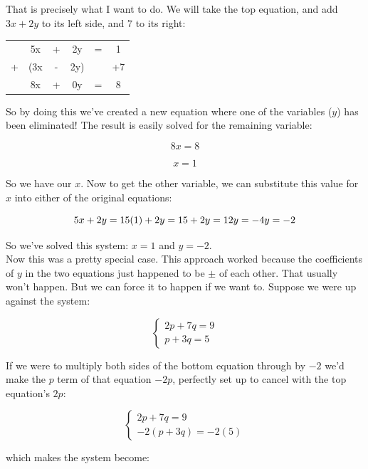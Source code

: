 That is precisely what I want to do. We will take the top equation, and add $3x+2y$ to its left side, and $7$ to its right:

\begin{center}
	\begin{tabular}{c@{\,}c@{\,}c@{\,}c@{\,}c@{\,}c}
		& 5x &+ & 2y & = & 1 \\
		+ & (3x &- & 2y) & & +7 \\
		\hline
		& 8x & + & 0y & = & 8 \\
	\end{tabular}
\end{center}

So by doing this we’ve created a new equation where one of the variables ($y$) has been eliminated!  The result is easily solved for the remaining variable:

$$8x=8$$

$$x=1$$

So we have our $x$. Now to get the other variable, we can substitute this value for $x$ into either of the original equations:

\begin{equation*}
	5x+2y=1\\
	5(1)+2y=1\\
	5+2y=1\\
	2y=-4\\
	y=-2
\end{equation*}

So we’ve solved this system: $x=1$ and $y=-2$.\\

Now this was a pretty special case. This approach worked because the coefficients of $y$ in the two equations just happened to be $\pm$ of each other. That usually won’t happen. But we can force it to happen if we want to. Suppose we were up against the system:

$$\begin{cases} 2p+7q=9\\p+3q=5 \end{cases}$$

If we were to multiply both sides of the bottom equation through by $-2$ we’d make the $p$ term of that equation $-2p$, perfectly set up to cancel with the top equation’s $2p$:

$$\begin{cases} 2p+7q=9\\-2(p+3q)=-2(5) \end{cases}$$

which makes the system become:

